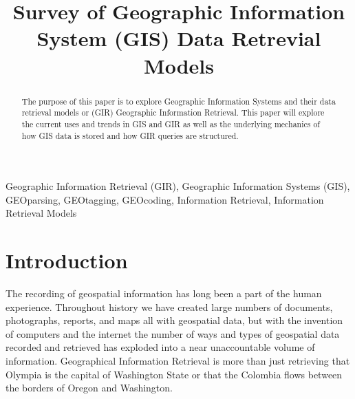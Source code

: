 \documentclass[10pt, conference, compsocconf]{IEEEtran}
\begin{document}
%
\title{Survey of Geographic Information System (GIS) Data Retrevial Models}



\author{

}

\IEEEoverridecommandlockouts
{}

\maketitle

\begin{abstract}
The purpose of this paper is to explore Geographic Information Systems and their data retrieval models or (GIR) Geographic Information Retrieval. This paper will explore the current uses and trends in GIS and GIR as well as the underlying mechanics of how GIS data is stored and how GIR queries are structured.

\end{abstract}

\begin{IEEEkeywords}
Geographic Information Retrieval (GIR), Geographic Information Systems (GIS), GEOparsing, GEOtagging, GEOcoding, Information Retrieval, Information Retrieval Models
\end{IEEEkeywords}

\IEEEpeerreviewmaketitle

\section{Introduction}
The recording of geospatial information has long been a part of the human experience. Throughout history we have created large numbers of documents, photographs, reports, and maps all with geospatial data, but with the invention of computers and the internet the number of ways and types of geospatial data recorded and retrieved has exploded into a near unaccountable volume of information. Geographical Information Retrieval is more than just retrieving that Olympia is the capital of Washington State or that the Colombia flows between the borders of Oregon and Washington. 
\end{document}

